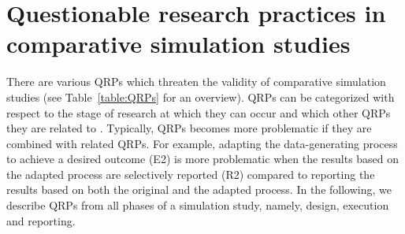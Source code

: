 \documentclass[a4paper, 11pt]{article}
\begin{document}
\section{Questionable research practices in comparative simulation studies} \label{sec:QRP}

There are various QRPs which threaten the validity of comparative simulation
studies (see Table~\ref{table:QRPs} for an overview). QRPs can be categorized
with respect to the stage of research at which they can occur and which other
QRPs they are related to \citep{Wicherts2016}. Typically, QRPs becomes more
problematic if they are combined with related QRPs. For example, adapting the
data-generating process to achieve a desired outcome (E2) is more problematic
when the results based on the adapted process are selectively reported (R2)
compared to reporting the results based on both the original and the adapted
process. In the following, we describe QRPs from all phases of a simulation
study, namely, design, execution and reporting.
\end{document}
